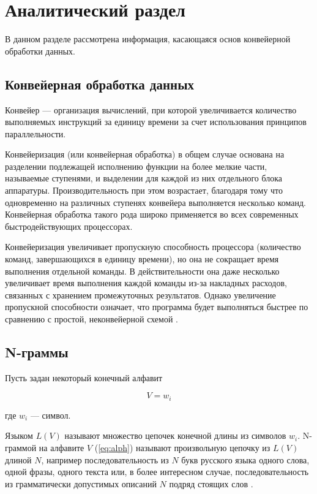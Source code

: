 \chapter{Аналитический раздел}

В данном разделе рассмотрена информация, касающаяся основ конвейерной обработки данных.

\section{Конвейерная обработка данных}

Конвейер --- организация вычислений, при которой увеличивается количество выполняемых инструкций за единицу времени за счет использования принципов параллельности.

Конвейеризация (или конвейерная обработка) в общем случае основана
на разделении подлежащей исполнению функции на более мелкие части, называемые ступенями, и выделении для каждой из них отдельного блока аппаратуры. Производительность при этом возрастает, благодаря тому что одновременно на различных ступенях конвейера выполняется несколько команд.
Конвейерная обработка такого рода широко применяется во всех современных быстродействующих
процессорах.

Конвейеризация увеличивает пропускную способность процессора (количество команд, завершающихся в единицу времени), но она не сокращает время выполнения отдельной команды. 
В действительности она даже несколько увеличивает время выполнения каждой команды из-за накладных расходов, связанных с хранением промежуточных результатов. 
Однако увеличение пропускной способности означает, что программа будет выполняться быстрее по
сравнению с простой, неконвейерной схемой \cite{info_conveyor}.

\section{N-граммы}

Пусть задан некоторый конечный алфавит 

\begin{equation}
	\label{eq:alph}
	V = {w_i}
\end{equation} 

где $w_i$ --- символ. 

Языком $L(V)$ называют множество цепочек конечной длины из символов $w_i$.
N-граммой на алфавите $V$ (\ref{eq:alph}) называют произвольную цепочку из $L(V)$ длиной $N$, например последовательность из $N$ букв русского языка одного слова, одной фразы, одного текста или, в более интересном случае, последовательность из грамматически допустимых описаний $N$ подряд стоящих слов \cite{info_ngram}.

